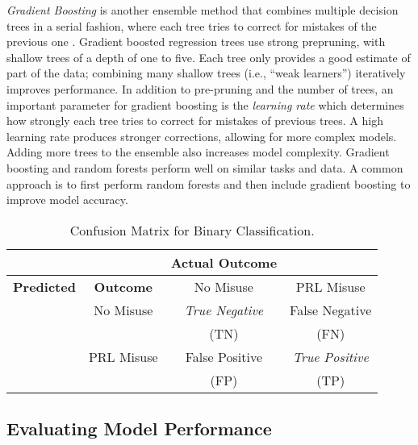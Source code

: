 \documentclass[sigconf]{acmart}
\begin{document}

\emph{Gradient Boosting} is another ensemble method that combines multiple 
decision trees in a serial fashion, where each tree tries to correct for 
mistakes of the previous one \cite{muller17}. Gradient boosted regression 
trees use strong prepruning, with shallow trees of a depth of one to five. 
Each tree only provides a good estimate of part of the data; combining many 
shallow trees (i.e., ``weak learners'') iteratively improves performance. 
In addition to pre-pruning and the number of trees, an important parameter 
for gradient boosting is the \emph{learning rate} which determines how 
strongly each tree tries to correct for mistakes of previous trees. A high 
learning rate produces stronger corrections, allowing for more complex models. 
Adding more trees to the ensemble also increases model complexity. Gradient 
boosting and random forests perform well on similar tasks and data. A common 
approach is to first perform random forests and then include gradient boosting 
to improve model accuracy. 


\begin{table}
  \caption{Confusion Matrix for Binary Classification.}
  \label{tab:freq}
  \begin{tabular}{cccc}
    \toprule
     & &  \textbf{Actual Outcome} & \\
    \midrule
    \textbf{Predicted} & \textbf{Outcome} & No Misuse & PRL Misuse \\
    \midrule
    & No Misuse & \textit{True Negative} & False Negative \\
    & & (TN) & (FN) \\
    \midrule
    & PRL Misuse & False Positive & \textit{True Positive} \\
    & & (FP) & (TP)  \\
    \bottomrule
  \end{tabular}
\end{table}


\subsection{Evaluating Model Performance}
\end{document}

